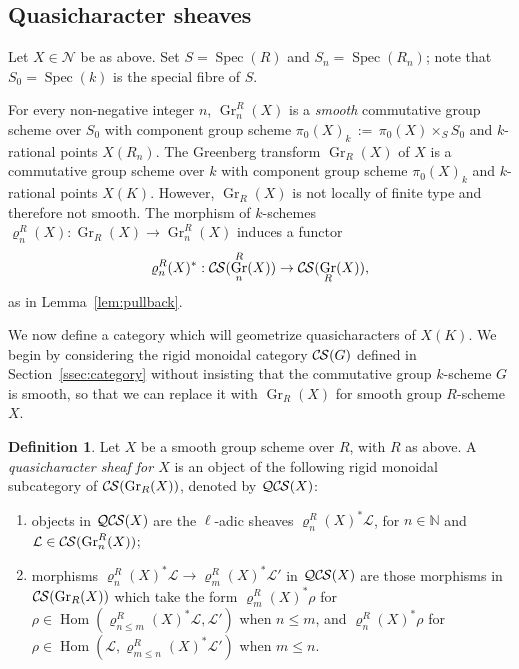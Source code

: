 \documentclass[10pt]{amsart}
\theoremstyle{plain}
\theoremstyle{definition}
\newtheorem{definition}[theorem]{Definition}
\newcommand{\NN}{{\mathbb{N}}}
\newcommand{\Fq}{k}
\DeclareMathOperator{\Hom}{Hom}
\DeclareMathOperator{\Gr}{Gr}
\newcommand{\Spec}[1]{{\operatorname{Spec}(#1)}}
\newcommand{\ceq}{{\, :=\, }}
\newcommand{\cs}[1]{{\mathcal{#1}}}
\newcommand{\CS}{{\mathcal{C\hskip-0.8pt S}}}
\newcommand{\QCS}{{\mathcal{QC\hskip-0.8pt S}}}
\begin{document}
\subsection{Quasicharacter sheaves}
\label{ssec:CS_on_GN}
 
Let $X \in \mathcal{N}$ be as above.
Set $S = \Spec{R}$ and $S_n = \Spec{R_n}$;
note that $S_0 = \Spec{\Fq}$ is the special fibre of $S$.

For every non-negative integer $n$, $\Gr^R_n(X)$ is a {\it smooth} commutative group scheme over $S_0$
with component group scheme $\pi_0(X)_{\Fq} \ceq \pi_0(X) \times_S S_0$ and $\Fq$-rational points $X(R_n).$
%
The Greenberg transform $\Gr_R(X)$ of $X$ is a commutative group scheme over $\Fq$
with component group scheme $\pi_0(X)_{\Fq}$
and $\Fq$-rational points $X(K).$
However, $\Gr_R(X)$ is not locally of finite type and therefore not smooth.
%
The morphism of $\Fq$-schemes $\varrho^R_n(X) : \Gr_R(X) \to \Gr^R_n(X)$ induces a functor
\[
\varrho^R_n(X)^* : \CS(\Gr^R_n(X)) \to \CS(\Gr_R(X)),
\]
as in Lemma~\ref{lem:pullback}.

We now define a category which will geometrize quasicharacters of $X(K)$.
We begin by considering the rigid monoidal category $\CS(G)$ defined in Section~\ref{ssec:category} without insisting that the commutative group $\Fq$-scheme $G$ is smooth, so that we can replace it with $\Gr_R(X)$ for smooth group $R$-scheme $X$.

\begin{definition}\label{def:QCS}
Let $X$ be a smooth group scheme over $R$, with $R$ as above.
A {\it quasicharacter sheaf for $X$} is an object of
the following rigid monoidal subcategory of $\CS(\Gr_R(X))$, denoted by $\QCS(X)$:
\begin{enumerate}
\item
objects in $\QCS(X)$ are the $\ell$-adic sheaves $\varrho^R_n(X)^*\cs{L}$, for $n\in \NN$ and $\cs{L} \in \CS(\Gr^R_n(X))$; 
\item
morphisms $\varrho^R_n(X)^*\cs{L} \to \varrho^R_m(X)^*\cs{L}'$ in $\QCS(X)$ are those morphisms in $\CS(\Gr_R(X))$ which take the form $\varrho^R_m(X)^*\rho$ for $\rho \in \Hom(\varrho^R_{n\leq m}(X)^*\cs{L},\cs{L}')$ when $n\leq m$, and $\varrho^R_n(X)^*\rho$ for $\rho \in \Hom(\cs{L},\varrho^R_{m\leq n}(X)^*\cs{L}')$ when $m\leq n$.
\end{enumerate}

\end{definition}
\end{document}
